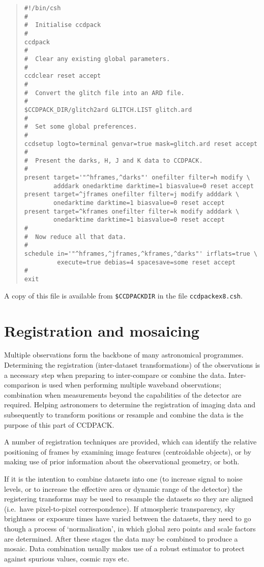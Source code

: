 \documentclass[twoside,11pt]{article}
\newcommand{\xlabel}[1]{}
\renewcommand{\_}{\texttt{\symbol{95}}}
\newenvironment{myquote}{\begin{quote}\begin{small}}{\end{small}\end{quote}}
\newcommand{\text}[1]{{\small \tt #1}}
\begin{document}
\begin{myquote}
\begin{verbatim}
#!/bin/csh
#
#  Initialise ccdpack
#
ccdpack
#
#  Clear any existing global parameters.
#
ccdclear reset accept
#
#  Convert the glitch file into an ARD file.
#
$CCDPACK_DIR/glitch2ard GLITCH.LIST glitch.ard
#
#  Set some global preferences.
#
ccdsetup logto=terminal genvar=true mask=glitch.ard reset accept
#
#  Present the darks, H, J and K data to CCDPACK.
#
present target='"^hframes,^darks"' onefilter filter=h modify \
        adddark onedarktime darktime=1 biasvalue=0 reset accept
present target=^jframes onefilter filter=j modify adddark \
        onedarktime darktime=1 biasvalue=0 reset accept
present target=^kframes onefilter filter=k modify adddark \
        onedarktime darktime=1 biasvalue=0 reset accept
#
#  Now reduce all that data.
#
schedule in='"^hframes,^jframes,^kframes,^darks"' irflats=true \
         execute=true debias=4 spacesave=some reset accept
#
exit
\end{verbatim}
\end{myquote}
A copy of this file is available from
\text{\$CCDPACK\_DIR} in the file \text{ccdpack\_ex8.csh}.



\section{Registration and mosaicing\xlabel{mosaicing}}

Multiple observations form the backbone of many astronomical programmes.
Determining the registration (inter-dataset transformations) of the
observations is a necessary step when preparing to inter-compare or
combine the data. Inter-comparison is used when performing multiple
waveband observations; combination when measurements beyond the
capabilities of the detector are required. Helping astronomers to
determine the registration of imaging data and subsequently to transform
positions or resample and combine the data is the purpose of this part
of CCDPACK.

A number of registration techniques are provided, which can
identify the relative positioning of frames by examining image
features (centroidable objects), or by making use of prior information
about the observational geometry, or both.

If it is the intention to combine datasets
into one (to increase signal to noise levels, or to increase the
effective area or dynamic range of the detector) the registering
transforms may be used to resample the datasets so they are aligned
(i.e.\ have pixel-to-pixel correspondence).  If atmospheric
transparency, sky brightness or exposure times have varied between the
datasets, they need to go though a process of `normalisation', in
which global zero points and scale factors are determined. After these
stages the data may be combined to produce a mosaic. Data combination
usually makes use of a robust estimator to protect against spurious
values, cosmic rays etc.
\end{document}

